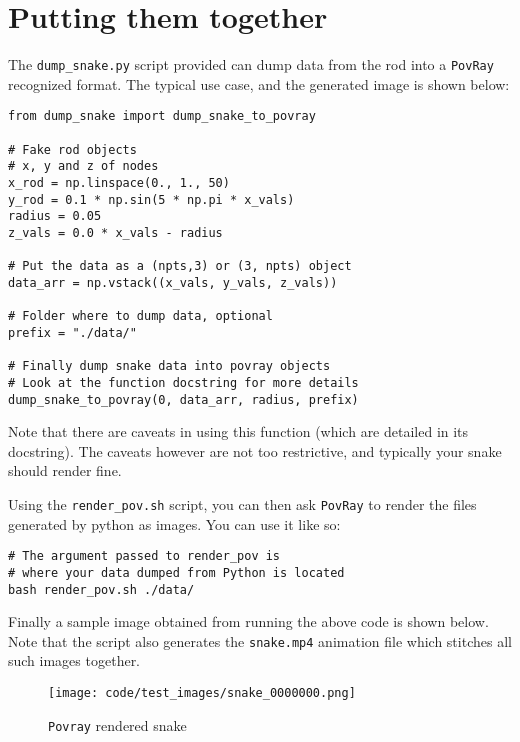 \documentclass[11pt]{article}
\begin{document}
\section{Putting them together}
\label{sec:org524221e}
The \texttt{dump\_snake.py} script provided can dump data from the rod into a \texttt{PovRay}
recognized format. The typical use case, and the generated image is shown
below:
\begin{verbatim}
from dump_snake import dump_snake_to_povray

# Fake rod objects
# x, y and z of nodes
x_rod = np.linspace(0., 1., 50)
y_rod = 0.1 * np.sin(5 * np.pi * x_vals)
radius = 0.05
z_vals = 0.0 * x_vals - radius

# Put the data as a (npts,3) or (3, npts) object
data_arr = np.vstack((x_vals, y_vals, z_vals))

# Folder where to dump data, optional
prefix = "./data/"

# Finally dump snake data into povray objects
# Look at the function docstring for more details
dump_snake_to_povray(0, data_arr, radius, prefix)
\end{verbatim}
Note that there are caveats in using this function (which are detailed in its
docstring). The caveats however are not too restrictive, and typically your
snake should render fine.

Using the \texttt{render\_pov.sh} script, you can then ask \texttt{PovRay} to render the
files generated by python as images. You can use it like so:

\begin{verbatim}
# The argument passed to render_pov is
# where your data dumped from Python is located
bash render_pov.sh ./data/
\end{verbatim}

Finally a sample image obtained from running the above code is shown below.
Note that the script also generates the \texttt{snake.mp4} animation file which
stitches all such images together.

\begin{figure}[htbp]
\centering
\texttt{[image: code/test\_images/snake\_0000000.png]}
\caption{\texttt{Povray} rendered snake}
\end{figure}
\end{document}
